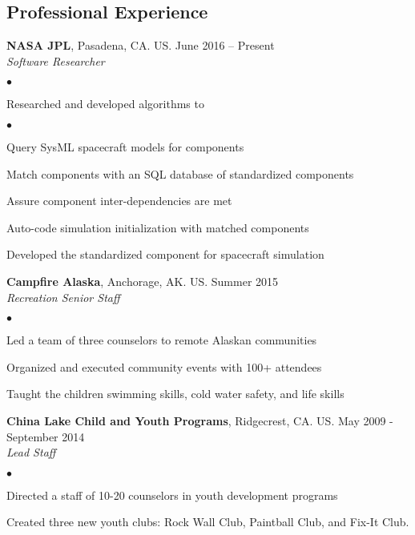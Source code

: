 \documentclass[margin,line]{res}
\newenvironment{list2}{
  \begin{list}{$\bullet$}{%
      \setlength{\itemsep}{0in}
      \setlength{\parsep}{0in} \setlength{\parskip}{0in}
      \setlength{\topsep}{0in} \setlength{\partopsep}{0in}
      \setlength{\leftmargin}{0.2in}}}{\end{list}}
\begin{document}
\begin{resume}
\section{\sc Professional Experience}
{\bf NASA JPL}, Pasadena, CA. US. \hfill{June 2016 -- Present}\\
{\em Software Researcher}\hfill 
\begin{list2} %
\item Researched and developed algorithms to
\begin{list2}
\item Query SysML spacecraft models for components
\item Match components with an SQL database of standardized components
\item Assure component inter-dependencies are met
\item Auto-code simulation initialization with matched components
\end{list2}
\item Developed the standardized component for spacecraft simulation
\end{list2}


{\bf Campfire Alaska}, Anchorage, AK. US. \hfill{Summer 2015}\\
{\em Recreation Senior Staff}\hfill 
\begin{list2} %
\item Led a team of three counselors to remote Alaskan communities  
\item Organized and executed community events with 100+ attendees 
\item Taught the children swimming skills, cold water safety, and life skills 
\end{list2}



{\bf China Lake Child and Youth Programs}, Ridgecrest, CA. US. \hfill{May 2009 - September 2014}\\
{\em Lead Staff}\hfill 
\begin{list2} %
\item Directed a staff of 10-20 counselors in youth development programs
\item Created three new youth clubs: Rock Wall Club, Paintball Club, and Fix-It Club. 
\end{list2}


\end{resume}
\end{document}
